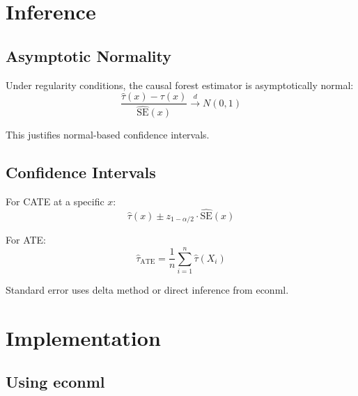 \section{Inference}
\label{sec:forest_inference}

\subsection{Asymptotic Normality}

\begin{theorem}
Under regularity conditions, the causal forest estimator is asymptotically normal:
\begin{equation}
\frac{\hat{\tau}(x) - \tau(x)}{\widehat{\text{SE}}(x)} \xrightarrow{d} N(0, 1)
\end{equation}
\end{theorem}

This justifies normal-based confidence intervals.

\subsection{Confidence Intervals}

For CATE at a specific $x$:
\begin{equation}
\hat{\tau}(x) \pm z_{1-\alpha/2} \cdot \widehat{\text{SE}}(x)
\end{equation}

For ATE:
\begin{equation}
\hat{\tau}_{\text{ATE}} = \frac{1}{n}\sum_{i=1}^{n} \hat{\tau}(X_i)
\end{equation}

Standard error uses delta method or direct inference from econml.

\section{Implementation}
\label{sec:forest_implementation}

\subsection{Using econml}

